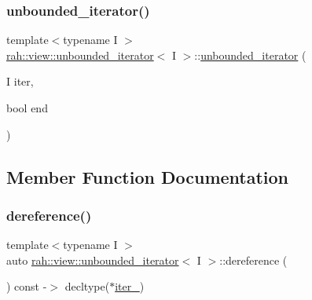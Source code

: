 \subsubsection{\texorpdfstring{unbounded\_iterator()}{unbounded\_iterator()}\hspace{0.1cm}{\footnotesize\ttfamily [2/2]}}
{\footnotesize\ttfamily template$<$typename I $>$ \\
\mbox{\hyperlink{structrah_1_1view_1_1unbounded__iterator}{rah\+::view\+::unbounded\+\_\+iterator}}$<$ I $>$\+::\mbox{\hyperlink{structrah_1_1view_1_1unbounded__iterator}{unbounded\+\_\+iterator}} (\begin{DoxyParamCaption}\item[{I}]{iter,  }\item[{bool}]{end }\end{DoxyParamCaption})\hspace{0.3cm}{\ttfamily [inline]}}



\subsection{Member Function Documentation}
\mbox{\label{structrah_1_1view_1_1unbounded__iterator_a99189d6052f625642f8e00ff6e58a860}} 
\subsubsection{\texorpdfstring{dereference()}{dereference()}}
{\footnotesize\ttfamily template$<$typename I $>$ \\
auto \mbox{\hyperlink{structrah_1_1view_1_1unbounded__iterator}{rah\+::view\+::unbounded\+\_\+iterator}}$<$ I $>$\+::dereference (\begin{DoxyParamCaption}{ }\end{DoxyParamCaption}) const -\/$>$ decltype($\ast$\mbox{\hyperlink{structrah_1_1view_1_1unbounded__iterator_a50affaae71d4122b92014b11763f6672}{iter\+\_\+}}) \hspace{0.3cm}{\ttfamily [inline]}}

\mbox{\label{structrah_1_1view_1_1unbounded__iterator_ae9234860041ae72e3b2667d8121fa224}} 
